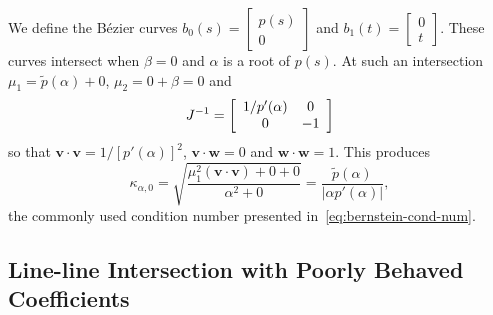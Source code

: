 \documentclass[3p, authoryear, square]{elsarticle}
\theoremstyle{definition}
\begin{document}
We define the B\'{e}zier curves \(b_0(s) = \left[ \begin{array}{c} p(s) \\ 0
\end{array}\right]\) and \(b_1(t) = \left[ \begin{array}{c} 0 \\ t
\end{array}\right]\). These curves intersect when \(\beta = 0\) and
\(\alpha\) is a root of \(p(s)\).
At such an intersection \(\mu_1 = \widetilde{p}(\alpha) + 0\),
\(\mu_2 = 0 + \beta = 0\) and
\begin{equation}
J^{-1} = \left[ \begin{array}{c c} 1 / p'(\alpha) & 0 \\ 0 & -1 \end{array}\right]
\end{equation}
so that \(\bm{v} \cdot \bm{v} = 1 / \left[p'(\alpha)\right]^2\), \(\bm{v} \cdot
\bm{w} = 0\) and \(\bm{w} \cdot \bm{w} = 1\). This produces
\begin{equation}
  \kappa_{\alpha, 0} = \sqrt{\frac{\mu_1^2 \left(\bm{v} \cdot \bm{v}\right) +
  0 + 0}{\alpha^2 + 0}} = \frac{\widetilde{p}(\alpha)}{\left|\alpha
  p'(\alpha)\right|},
\end{equation}
the commonly used condition number presented
in~\eqref{eq:bernstein-cond-num}.

\subsection{Line-line Intersection with Poorly Behaved Coefficients}
\end{document}
